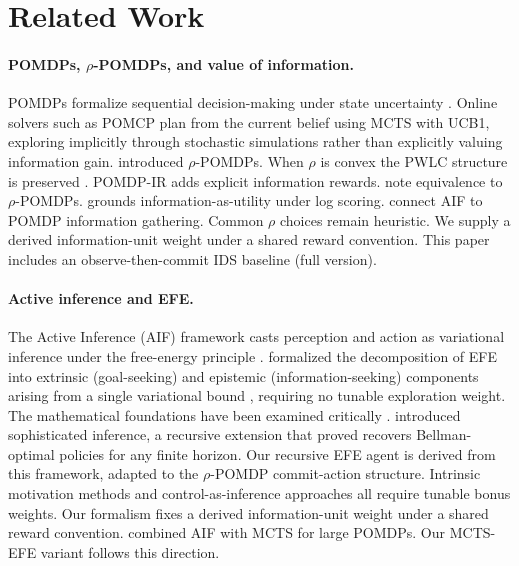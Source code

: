 \documentclass[runningheads]{llncs}
\begin{document}
\section{Related Work}

\paragraph{POMDPs, $\rho$-POMDPs, and value of information.}
POMDPs formalize sequential decision-making under state uncertainty \citep{smallwood1973, kaelbling1998}. Online solvers such as POMCP \citep{silver2010} plan from the current belief using MCTS with UCB1, exploring implicitly through stochastic simulations rather than explicitly valuing information gain. \citet{araya2010} introduced $\rho$-POMDPs. When $\rho$ is convex the PWLC structure is preserved \citep{fehr2018, benchetrit2025}. POMDP-IR \citep{spaan2015} adds explicit information rewards. \citet{satsangi2018} note equivalence to $\rho$-POMDPs. \citet{bernardo1979} grounds information-as-utility under log scoring. \citet{walraven2024} connect AIF to POMDP information gathering. Common $\rho$ choices remain heuristic. We supply a derived information-unit weight under a shared reward convention. This paper includes an observe-then-commit IDS baseline (full version).

\paragraph{Active inference and EFE.}
The Active Inference (AIF) framework \citep{friston2010} casts perception and action as variational inference under the free-energy principle \citep{parr2022}. \citet{friston2015} formalized the decomposition of EFE into extrinsic (goal-seeking) and epistemic (information-seeking) components arising from a single variational bound \citep{dacosta2020, parr2019}, requiring no tunable exploration weight. The mathematical foundations have been examined critically \citep{millidge2021, champion2024, devries2025}. \citet{friston2021} introduced sophisticated inference, a recursive extension that \citet{dacosta2020b} proved recovers Bellman-optimal policies for any finite horizon. Our recursive EFE agent is derived from this framework, adapted to the $\rho$-POMDP commit-action structure. Intrinsic motivation methods \citep{schmidhuber1991, pathak2017, itti2009, bellemare2016, houthooft2016, burda2019} and control-as-inference approaches \citep{todorov2007, levine2018, haarnoja2018, millidge2020, sajid2021} all require tunable bonus weights. Our formalism fixes a derived information-unit weight under a shared reward convention. \citet{maisto2025} combined AIF with MCTS for large POMDPs. Our MCTS-EFE variant follows this direction.
\end{document}
